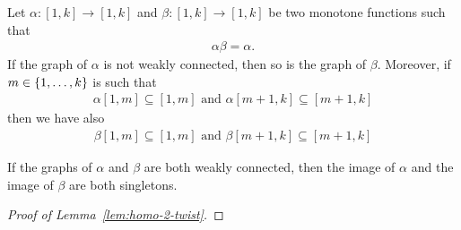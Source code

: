 \begin{lemma}
Let $\alpha:[1,k]\to [1,k]$ and $\beta:[1,k]\to [1,k]$ be two monotone functions such that
\begin{align*}
\alpha\beta=\alpha.
\end{align*}
 If the graph of $\alpha$ is not weakly connected, then so is the graph of $\beta$. Moreover, if $m\in \{1,\dots, k\}$ is such that 
\begin{align*}
\alpha[1,m] \subseteq [1,m]  \text{ and } 
\alpha[m+1,k]\subseteq [m+1,k]
\end{align*}
then we have also 
\begin{align*}
\beta[1,m]\subseteq [1,m] \text{ and }
\beta[m+1,k]\subseteq [m+1,k]
\end{align*}

 If the graphs of $\alpha$ and $\beta$ are both weakly connected, then the image of $\alpha$ and the image of $\beta$ are both singletons.
\end{lemma}

\begin{proof}[Proof of Lemma~\ref{lem:homo-2-twist}]

\end{proof}
